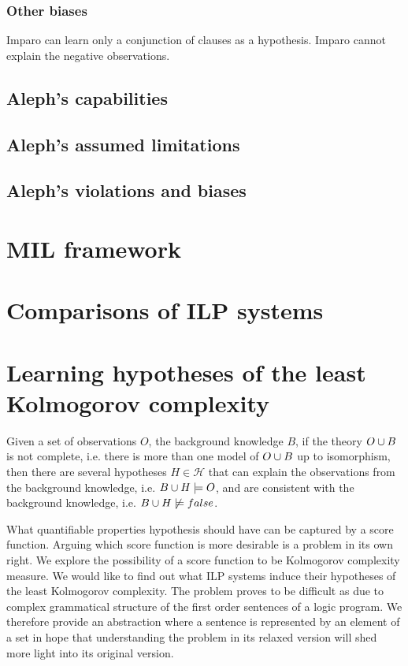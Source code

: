 \subsection{Other biases}
Imparo can learn only a conjunction of clauses as a hypothesis.
Imparo cannot explain the negative observations.

\section{Aleph's capabilities}
\section{Aleph's assumed limitations}
\section{Aleph's violations and biases}

\chapter{MIL framework}

\chapter{Comparisons of ILP systems}

\chapter{Learning hypotheses of the least Kolmogorov complexity}

Given a set of observations $O$, the background knowledge $B$, if the theory $O \cup B$ is not complete, i.e. there is more than one model of $O \cup B$ up to isomorphism, then there are several hypotheses $H \in \mathcal{H}$ that can explain the observations from the background knowledge, i.e. $B \cup H \models O$, and are consistent with the background knowledge, i.e. $B \cup H \not\models false$.

What quantifiable properties hypothesis should have can be captured by a score function. Arguing which score function is more desirable is a problem in its own right. We explore the possibility of a score function to be Kolmogorov complexity measure. We would like to find out what ILP systems induce their hypotheses of the least Kolmogorov complexity. The problem proves to be difficult as due to complex grammatical structure of the first order sentences of a logic program. We therefore provide an abstraction where a sentence is represented by an element of a set in hope that understanding the problem in its relaxed version will shed more light into its original version.

